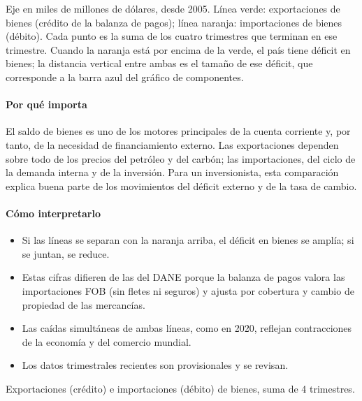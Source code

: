 \begin{leer}
Eje en miles de millones de dólares, desde 2005. Línea verde: exportaciones de bienes (crédito de la balanza de pagos); línea naranja: importaciones de bienes (débito). Cada punto es la suma de los cuatro trimestres que terminan en ese trimestre. Cuando la naranja está por encima de la verde, el país tiene déficit en bienes; la distancia vertical entre ambas es el tamaño de ese déficit, que corresponde a la barra azul del gráfico de componentes.
\end{leer}

\paragraph{Por qué importa}
El saldo de bienes es uno de los motores principales de la cuenta corriente y, por tanto, de la necesidad de financiamiento externo. Las exportaciones dependen sobre todo de los precios del petróleo y del carbón; las importaciones, del ciclo de la demanda interna y de la inversión. Para un inversionista, esta comparación explica buena parte de los movimientos del déficit externo y de la tasa de cambio.

\paragraph{Cómo interpretarlo}
\begin{itemize}
\item Si las líneas se separan con la naranja arriba, el déficit en bienes se amplía; si se juntan, se reduce.
\item Estas cifras difieren de las del DANE porque la balanza de pagos valora las importaciones FOB (sin fletes ni seguros) y ajusta por cobertura y cambio de propiedad de las mercancías.
\item Las caídas simultáneas de ambas líneas, como en 2020, reflejan contracciones de la economía y del comercio mundial.
\item Los datos trimestrales recientes son provisionales y se revisan.
\end{itemize}
\begin{formulas}[Fórmulas]
\end{formulas}
\begin{metodo}[Metodología]
Exportaciones (crédito) e importaciones (débito) de bienes, suma de 4 trimestres.
\par{}
\end{metodo}

